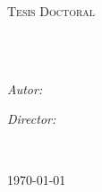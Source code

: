 \documentclass[
11pt, %
spanish, %
singlespacing, %
headsepline, %
]{MastersDoctoralThesis} %
\author{Tadeo Javier \textsc{Cocucci}} %
\begin{document}
\frontmatter %

\pagestyle{plain} %


\begin{titlepage}
    \begin{center}
    
    \vspace*{.06\textheight}
    {\scshape\LARGE \univname\par}\vspace{1.5cm} %
    \textsc{\Large Tesis Doctoral}\\[0.5cm] %
    
    \HRule \\[0.4cm] %
    {\huge \bfseries \ttitle\par}\vspace{0.4cm} %
    \HRule \\[1.5cm] %
     
    \begin{minipage}[t]{0.4\textwidth}
    \begin{flushleft} \large
    \emph{Autor:}\\
    \authorname %
    \end{flushleft}
    \end{minipage}
    \begin{minipage}[t]{0.4\textwidth}
    \begin{flushright} \large
    \emph{Director:} \\
    \supname
    \end{flushright}
    \end{minipage}\\[3cm]
     
    \vfill
    
     
    \vfill
    
    {\large \today}\\[4cm] %
     
    \vfill
    \end{center}
\end{titlepage}
\end{document}
